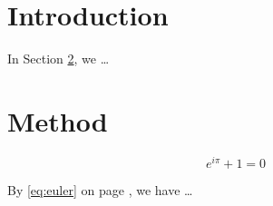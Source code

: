 \section{Introduction}
\label{sec:intro}

In Section \ref{sec:method}, we \ldots

\section{Method}
\label{sec:method}

\begin{equation}
\label{eq:euler}
e^{i\pi} + 1 = 0
\end{equation}

By \eqref{eq:euler} on page
\pageref{eq:euler}, we have \ldots
